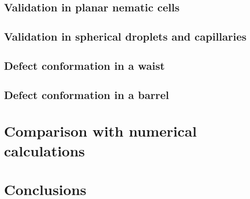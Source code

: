 \subsection{Validation in planar nematic cells}
\subsection{Validation in spherical droplets and capillaries}
\subsection{Defect conformation in a waist}
\subsection{Defect conformation in a barrel}

\section{Comparison with numerical calculations}

\section{Conclusions}
